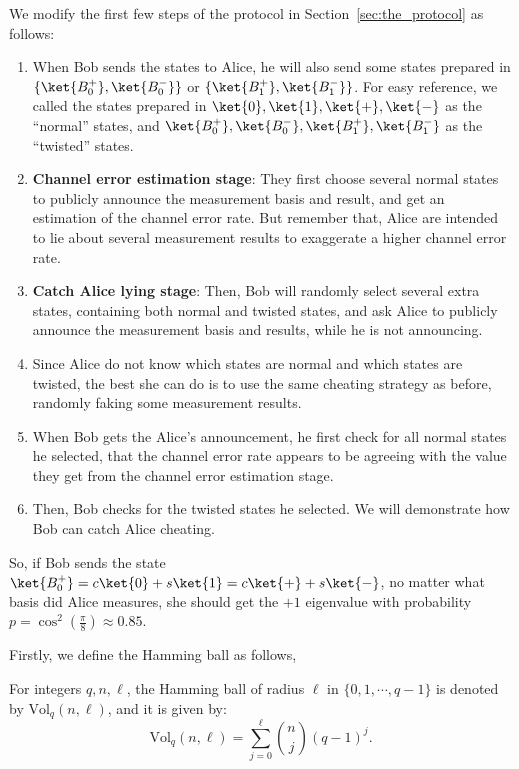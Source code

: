 We modify the first few steps of the protocol in Section~\ref{sec:the_protocol} as follows: 
\begin{enumerate}
    \item When Bob sends the states to Alice, he will also send some states prepared in $\{\ket{B_0^+}, \ket{B_0^-}\}$ or $\{\ket{B_1^+}, \ket{B_1^-}\}$. For easy reference, we called the states prepared in $\ket{0}, \ket{1}, \ket{+}, \ket{-}$ as the ``normal'' states, and $\ket{B_0^+}, \ket{B_0^-},\ket{B_1^+}, \ket{B_1^-}$ as the ``twisted'' states.
    
    \item \textbf{Channel error estimation stage}: They first choose several normal states to publicly announce the measurement basis and result, and get an estimation of the channel error rate. But remember that, Alice are intended to lie about several measurement results to exaggerate a higher channel error rate.

    \item \textbf{Catch Alice lying stage}: Then, Bob will randomly select several extra states, containing both normal and twisted states, and ask Alice to publicly announce the measurement basis and results, while he is not announcing. 

    \item Since Alice do not know which states are normal and which states are twisted, the best she can do is to use the same cheating strategy as before, randomly faking some measurement results.

    \item When Bob gets the Alice's announcement, he first check for all normal states he selected, that the channel error rate appears to be agreeing with the value they get from the channel error estimation stage.

    \item Then, Bob checks for the twisted states he selected. We will demonstrate how Bob can catch Alice cheating.
\end{enumerate}

So, if Bob sends the state $\ket{B_0^+}=c\ket{0}+s\ket{1}=c\ket{+}+s\ket{-}$, no matter what basis did Alice measures, she should get the $+1$ eigenvalue with probability $p=\cos^2\left(\frac{\pi}{8}\right)\approx 0.85$. 



Firstly, we define the Hamming ball as follows,

\begin{definition}
    For integers $q, n, \ell$, the Hamming ball of radius $\ell$ in $\{0, 1, \cdots, q-1\}$ is denoted by $\mathrm{Vol}_q(n, \ell)$, and it is given by:
    \begin{equation}
        \mathrm{Vol}_q(n, \ell) = \sum_{j=0}^{\ell} \binom{n}{j} (q - 1)^j.
    \end{equation}
\end{definition}